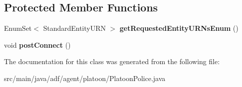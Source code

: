 \subsection*{Protected Member Functions}
\begin{DoxyCompactItemize}
\item 
\hypertarget{classadf_1_1agent_1_1platoon_1_1PlatoonPolice_ab878fbe79e592829fc6825e9a7ac74d2}{}\label{classadf_1_1agent_1_1platoon_1_1PlatoonPolice_ab878fbe79e592829fc6825e9a7ac74d2} 
Enum\+Set$<$ Standard\+Entity\+U\+RN $>$ {\bfseries get\+Requested\+Entity\+U\+R\+Ns\+Enum} ()
\item 
\hypertarget{classadf_1_1agent_1_1platoon_1_1PlatoonPolice_a466b75fef22d0931433d9c19da413b87}{}\label{classadf_1_1agent_1_1platoon_1_1PlatoonPolice_a466b75fef22d0931433d9c19da413b87} 
void {\bfseries post\+Connect} ()
\end{DoxyCompactItemize}


The documentation for this class was generated from the following file\+:\begin{DoxyCompactItemize}
\item 
src/main/java/adf/agent/platoon/Platoon\+Police.\+java\end{DoxyCompactItemize}
